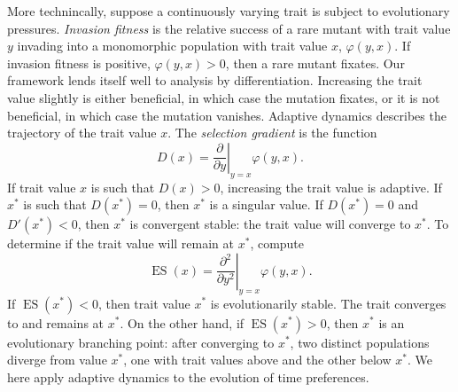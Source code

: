 \documentclass[titlepage, hidelinks, 12pt]{article}
\theoremstyle{plain}
\theoremstyle{remark}
\theoremstyle{definition}
\DeclareMathOperator{\ES}{ES}
\begin{document}
More technincally, suppose a continuously varying trait is subject to evolutionary pressures. \textit{Invasion fitness} is the relative
success of a rare mutant with trait value $y$ invading into a monomorphic population with trait value $x$, $\varphi(y, x)$. If invasion
fitness is positive, $\varphi(y, x) > 0$, then a rare mutant fixates. Our framework lends itself well to analysis by differentiation. 
Increasing the trait value slightly is either beneficial, in which case the mutation fixates, or it is not beneficial, in which
case the mutation vanishes. Adaptive dynamics describes the trajectory of the trait value $x$. 
The \textit{selection gradient} is the function 
\begin{equation}
    D(x) = \left.\frac{\partial }{\partial y} \right\vert_{y = x}\varphi(y, x).
    \label{eqn:selection_gradient}
\end{equation}
If trait value $x$ is such that $D(x) > 0$, increasing the trait value is adaptive. If $x^*$ is such that $D(x^*) = 0$, then $x^*$ is a
singular value. If $D(x^*) = 0$ and $D'(x^*) < 0$, 
then $x^*$ is convergent stable: the trait value will converge to $x^*$. To determine if the trait value will remain at $x^*$, compute
\begin{equation}
    \ES(x) = \left.\frac{\partial^2 }{\partial y^2} \right\vert_{y = x}\varphi(y, x).
    \label{eqn:evolutionary_stability}
\end{equation}
If $\ES(x^*) < 0$, then trait value $x^*$ is evolutionarily stable. The trait converges to and remains at $x^*$. On the other hand, if
$\ES(x^*) > 0$, then $x^*$ is an evolutionary branching point: after converging to $x^*$, two distinct populations diverge from value $x^*$, one
with trait values above and the other below $x^*$.  We here apply adaptive dynamics to the evolution of time preferences. 
\end{document}
